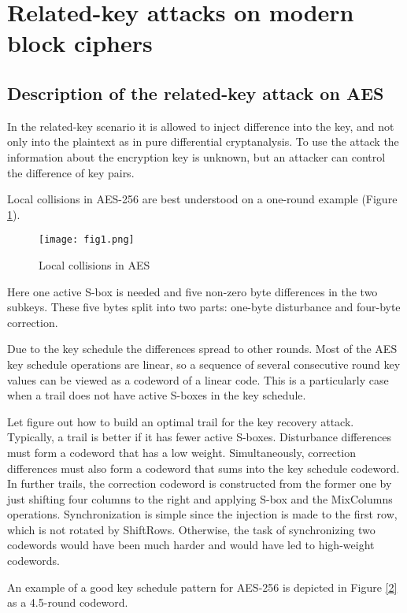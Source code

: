 \documentclass[a4paper,12pt]{spieman} %
\begin{document}
\tableofcontents
\newpage

\section{Related-key attacks on modern block ciphers}
\subsection{Description of the related-key attack on AES}

In the related-key scenario it is allowed to inject difference into the key, and not only into the plaintext as in pure differential cryptanalysis. To use the attack the information about the encryption key is unknown, but an attacker can control the difference of key pairs.

Local collisions in AES-256 are best understood on a one-round example (Figure \ref{1}).

\begin{figure}[H]
    \centering
    \texttt{[image: fig1.png]}
    \caption{Local collisions in AES}
    \label{1}
\end{figure}

Here one active S-box is needed and five non-zero byte differences in the two subkeys. These five bytes split into two parts: one-byte disturbance and four-byte correction.

Due to the key schedule the differences spread to other rounds. Most of the AES key schedule operations are linear, so a sequence of several consecutive round key values can be viewed as a codeword of a linear code. This is a particularly case when a trail does not have active S-boxes in the key schedule.

Let figure out how to build an optimal trail for the key recovery attack. Typically, a trail is better if it has fewer active S-boxes. Disturbance differences must form a codeword that has a low weight. Simultaneously, correction differences must also form a codeword that sums into the key schedule codeword. In further trails, the correction codeword is constructed from the former one by just shifting four columns to the right and applying S-box and the MixColumns operations. Synchronization is simple since the injection is made to the first row, which is not rotated by ShiftRows. Otherwise, the task of synchronizing two codewords would have been much harder and would have led to high-weight codewords.

An example of a good key schedule pattern for AES-256 is depicted in Figure \ref{2} as a 4.5-round codeword.
\end{document}
